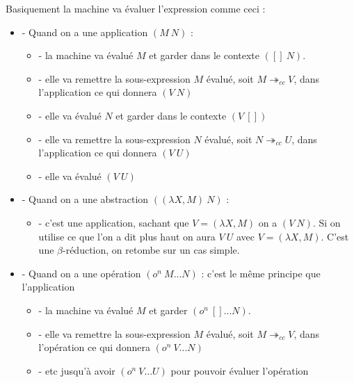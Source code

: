 \documentclass[10pt,a4paper]{article}
\begin{document}
				
				Basiquement la machine va évaluer l'expression comme ceci :
				\begin{itemize}
					\item[] - Quand on a une application $(M~N)$ :
					\begin{itemize}
						\item[] - la machine va évalué $M$ et garder dans le contexte $([]~N)$.
						\item[] - elle va remettre la sous-expression $M$ évalué, soit $M \twoheadrightarrow_{cc} V$, dans l'application ce qui donnera $(V~N)$
						\item[] - elle va évalué $N$ et garder dans le contexte $(V~[])$ 
						\item[] - elle va remettre la sous-expression $N$ évalué, soit $N \twoheadrightarrow_{cc} U$, dans l'application ce qui donnera $(V~U)$
						\item[] - elle va évalué $(V~U)$ 
					\end{itemize}
					\item[] - Quand on a une abstraction $((\lambda X,M)~N)$ : 
					\begin{itemize}
						\item[] - c'est une application, sachant que $V = (\lambda X,M)$ on a $(V~N)$. Si on utilise ce que l'on a dit plus haut on aura $V~U$ avec  $V = (\lambda X,M)$. C'est une $\beta$-réduction, on retombe sur un cas simple.
					\end{itemize}
					\item[] - Quand on a une opération $(o^{n}~M...N)$ : c'est le même principe que l'application
					\begin{itemize}
						\item[] - la machine va évalué $M$ et garder $(o^{n}~[]...N)$.
						\item[] - elle va remettre la sous-expression $M$ évalué, soit $M \twoheadrightarrow_{cc} V$, dans l'opération ce qui donnera $(o^{n}~V...N)$
						\item[] - etc jusqu'à avoir $(o^{n}~V...U)$ pour pouvoir évaluer l'opération
					\end{itemize}
 				\end{itemize}
				\bigbreak
				
\end{document}
